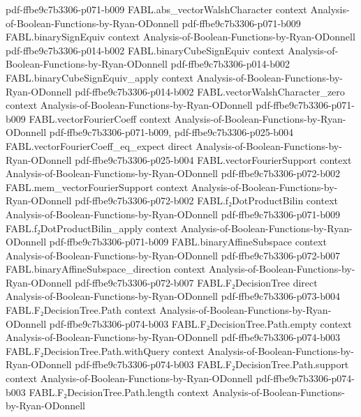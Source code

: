 \begin{theorem}
  {pdf-ffbe9c7b3306-p071-b009}
\proofstep
  {FABL.abs_vectorWalshCharacter}
  {context}
  {Analysis-of-Boolean-Functions-by-Ryan-ODonnell}
  {pdf-ffbe9c7b3306-p071-b009}
\proofstep
  {FABL.binarySignEquiv}
  {context}
  {Analysis-of-Boolean-Functions-by-Ryan-ODonnell}
  {pdf-ffbe9c7b3306-p014-b002}
\proofstep
  {FABL.binaryCubeSignEquiv}
  {context}
  {Analysis-of-Boolean-Functions-by-Ryan-ODonnell}
  {pdf-ffbe9c7b3306-p014-b002}
\proofstep
  {FABL.binaryCubeSignEquiv_apply}
  {context}
  {Analysis-of-Boolean-Functions-by-Ryan-ODonnell}
  {pdf-ffbe9c7b3306-p014-b002}
\proofstep
  {FABL.vectorWalshCharacter_zero}
  {context}
  {Analysis-of-Boolean-Functions-by-Ryan-ODonnell}
  {pdf-ffbe9c7b3306-p071-b009}
\proofstep
  {FABL.vectorFourierCoeff}
  {context}
  {Analysis-of-Boolean-Functions-by-Ryan-ODonnell}
  {pdf-ffbe9c7b3306-p071-b009,
    pdf-ffbe9c7b3306-p025-b004}
\proofstep
  {FABL.vectorFourierCoeff_eq_expect}
  {direct}
  {Analysis-of-Boolean-Functions-by-Ryan-ODonnell}
  {pdf-ffbe9c7b3306-p025-b004}
\proofstep
  {FABL.vectorFourierSupport}
  {context}
  {Analysis-of-Boolean-Functions-by-Ryan-ODonnell}
  {pdf-ffbe9c7b3306-p072-b002}
\proofstep
  {FABL.mem_vectorFourierSupport}
  {context}
  {Analysis-of-Boolean-Functions-by-Ryan-ODonnell}
  {pdf-ffbe9c7b3306-p072-b002}
\proofstep
  {FABL.f₂DotProductBilin}
  {context}
  {Analysis-of-Boolean-Functions-by-Ryan-ODonnell}
  {pdf-ffbe9c7b3306-p071-b009}
\proofstep
  {FABL.f₂DotProductBilin_apply}
  {context}
  {Analysis-of-Boolean-Functions-by-Ryan-ODonnell}
  {pdf-ffbe9c7b3306-p071-b009}
\proofstep
  {FABL.binaryAffineSubspace}
  {context}
  {Analysis-of-Boolean-Functions-by-Ryan-ODonnell}
  {pdf-ffbe9c7b3306-p072-b007}
\proofstep
  {FABL.binaryAffineSubspace_direction}
  {context}
  {Analysis-of-Boolean-Functions-by-Ryan-ODonnell}
  {pdf-ffbe9c7b3306-p072-b007}
\proofstep
  {FABL.F₂DecisionTree}
  {direct}
  {Analysis-of-Boolean-Functions-by-Ryan-ODonnell}
  {pdf-ffbe9c7b3306-p073-b004}
\proofstep
  {FABL.F₂DecisionTree.Path}
  {context}
  {Analysis-of-Boolean-Functions-by-Ryan-ODonnell}
  {pdf-ffbe9c7b3306-p074-b003}
\proofstep
  {FABL.F₂DecisionTree.Path.empty}
  {context}
  {Analysis-of-Boolean-Functions-by-Ryan-ODonnell}
  {pdf-ffbe9c7b3306-p074-b003}
\proofstep
  {FABL.F₂DecisionTree.Path.withQuery}
  {context}
  {Analysis-of-Boolean-Functions-by-Ryan-ODonnell}
  {pdf-ffbe9c7b3306-p074-b003}
\proofstep
  {FABL.F₂DecisionTree.Path.support}
  {context}
  {Analysis-of-Boolean-Functions-by-Ryan-ODonnell}
  {pdf-ffbe9c7b3306-p074-b003}
\proofstep
  {FABL.F₂DecisionTree.Path.length}
  {context}
  {Analysis-of-Boolean-Functions-by-Ryan-ODonnell}

\end{theorem}
